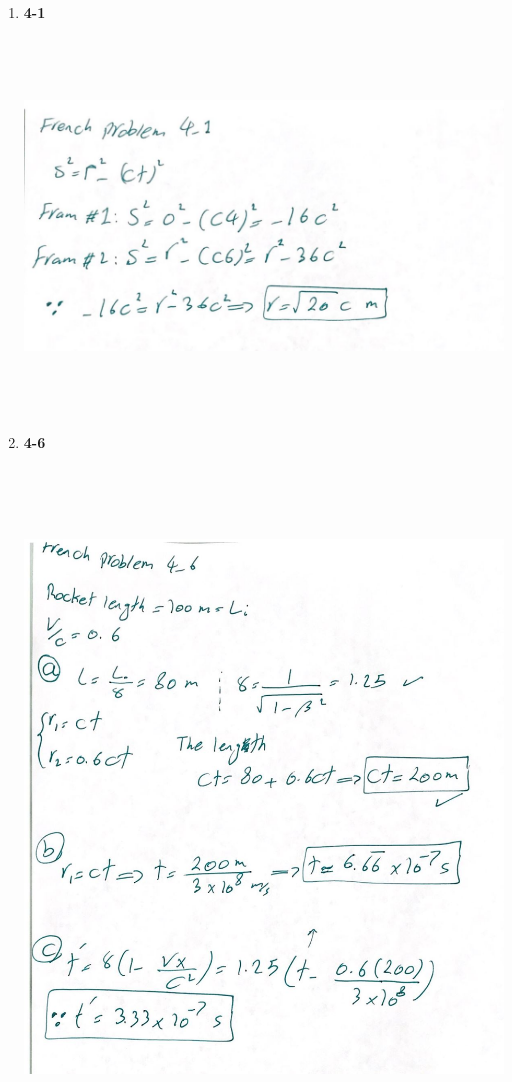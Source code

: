 \documentclass[fleqn]{article}
\begin{document}
\begin{enumerate}
    \pagebreak

    \item \textbf{4-1}
    
    \begin{center}
      \includegraphics[height=10cm, width=14cm]{4-1.JPG}
    \end{center}

    \pagebreak

    \item \textbf{4-6}
    
    \begin{center}
      \includegraphics[height=18cm, width=14cm]{4-6.JPG}
    \end{center}


  \end{enumerate}
\end{document}
